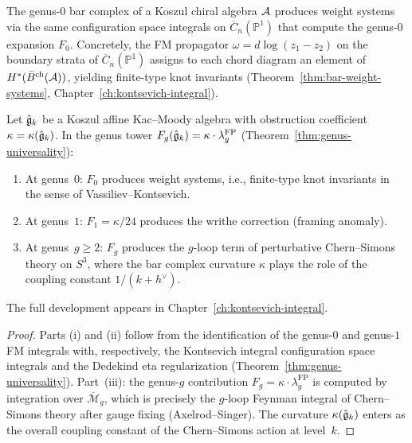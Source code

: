 \begin{remark}
\label{rem:genus-0-weight-systems}
The genus-$0$ bar complex of a Koszul chiral algebra $\mathcal{A}$
produces weight systems via the same configuration space integrals
on $\overline{C}_n(\mathbb{P}^1)$ that compute the genus-$0$
expansion $F_0$.  Concretely, the FM propagator
$\omega = d\log(z_1 - z_2)$ on the boundary strata of
$\overline{C}_n(\mathbb{P}^1)$ assigns to each chord diagram
an element of $H^*(\bar{B}^{\mathrm{ch}}(\mathcal{A}))$, yielding
finite-type knot invariants
(Theorem~\ref{thm:bar-weight-systems},
Chapter~\ref{ch:kontsevich-integral}).
\end{remark}

\begin{proposition}
\label{prop:loop-expansion-knots}
Let $\hat{\mathfrak{g}}_k$ be a Koszul affine Kac--Moody algebra with
obstruction coefficient $\kappa = \kappa(\hat{\mathfrak{g}}_k)$.  In the
genus tower $F_g(\hat{\mathfrak{g}}_k) = \kappa \cdot \lambda_g^{\mathrm{FP}}$
\textup{(}Theorem~\textup{\ref{thm:genus-universality})}:
\begin{enumerate}
\item At genus~$0$: $F_0$ produces weight systems, i.e.,
  finite-type knot invariants in the sense of Vassiliev--Kontsevich.
\item At genus~$1$: $F_1 = \kappa/24$ produces the writhe correction
  \textup{(}framing anomaly\textup{)}.
\item At genus~$g \geq 2$: $F_g$ produces the $g$-loop term of
  perturbative Chern--Simons theory on $S^3$, where the bar complex
  curvature $\kappa$ plays the role of the coupling constant
  $1/(k + h^{\vee})$.
\end{enumerate}
The full development appears in Chapter~\textup{\ref{ch:kontsevich-integral}}.
\end{proposition}

\begin{proof}
Parts (i) and (ii) follow from the identification of the genus-$0$
and genus-$1$ FM integrals with, respectively, the Kontsevich integral
configuration space integrals and the Dedekind eta regularization
(Theorem~\ref{thm:genus-universality}).  Part~(iii): the genus-$g$
contribution $F_g = \kappa \cdot \lambda_g^{\mathrm{FP}}$ is computed
by integration over $\overline{\mathcal{M}}_g$, which is precisely the
$g$-loop Feynman integral of Chern--Simons theory after gauge fixing
(Axelrod--Singer).  The curvature $\kappa(\hat{\mathfrak{g}}_k)$ enters as the
overall coupling constant of the Chern--Simons action at level~$k$.
\end{proof}

